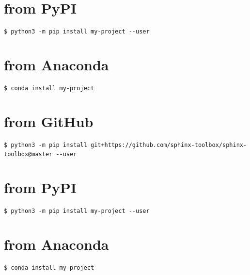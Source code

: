 \documentclass[letterpaper,10pt,english]{sphinxmanual}
\begin{document}
\chapter{from PyPI}
\label{\detokenize{installation:installation-14-from_PyPI}}\label{\detokenize{installation:installation-14}}
\begin{Verbatim}[commandchars=\\\{\}]
$ python3 -m pip install my-project --user
\end{Verbatim}


\chapter{from Anaconda}
\label{\detokenize{installation:installation-14-from_Anaconda}}
\begin{Verbatim}[commandchars=\\\{\}]
$ conda install my-project
\end{Verbatim}


\chapter{from GitHub}
\label{\detokenize{installation:installation-14-from_GitHub}}
\begin{Verbatim}[commandchars=\\\{\}]
$ python3 -m pip install git+https://github.com/sphinx-toolbox/sphinx-toolbox@master --user
\end{Verbatim}


\chapter{from PyPI}
\label{\detokenize{installation:installation-15-from_PyPI}}\label{\detokenize{installation:installation-15}}
\begin{Verbatim}[commandchars=\\\{\}]
$ python3 -m pip install my-project --user
\end{Verbatim}


\chapter{from Anaconda}
\label{\detokenize{installation:installation-15-from_Anaconda}}
\begin{Verbatim}[commandchars=\\\{\}]
$ conda install my-project
\end{Verbatim}
\end{document}
